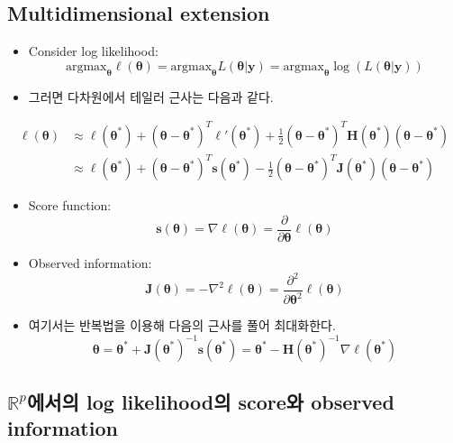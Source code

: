 \documentclass[
  letterpaper,
  DIV=11,
  numbers=noendperiod]{scrreprt}
\theoremstyle{definition}
\theoremstyle{definition}
\theoremstyle{remark}
\begin{document}
\subsection{Multidimensional
extension}\label{multidimensional-extension}

\begin{itemize}
\item
  Consider log likelihood: \[
  \text{argmax}_{\pmb{\theta}} \ell (\pmb{\theta}) = \text{argmax}_{\pmb{\theta}} L(\pmb{\theta}|\pmb{y})= \text{argmax}_{\pmb{\theta}} \log( L(\pmb{\theta}|\pmb{y}) )
  \]
\item
  그러면 다차원에서 테일러 근사는 다음과 같다.
\end{itemize}

\begin{align*}
\ell (\pmb{\theta}) &\approx \ell (\pmb{\theta}^{*}) + (\pmb{\theta} - \pmb{\theta}^{*})^T \ell ' (\pmb{\theta}^{*}) + \frac{1}{2} (\pmb{\theta} - \pmb{\theta}^{*})^T \pmb{H}(\pmb{\theta}^{*})(\pmb{\theta}-\pmb{\theta}^{*})\\
&\approx \ell (\pmb{\theta}^{*}) + (\pmb{\theta} - \pmb{\theta}^{*})^T \pmb{s} (\pmb{\theta}^{*}) - \frac{1}{2} (\pmb{\theta} - \pmb{\theta}^{*})^T \pmb{J}(\pmb{\theta}^{*})(\pmb{\theta}-\pmb{\theta}^{*})
\end{align*}

\begin{itemize}
\item
  Score function: \[
  \pmb{s} (\pmb{\theta}) = \nabla \ell (\pmb{\theta}) = \frac{\partial}{\partial \pmb{\theta}} \ell (\pmb{\theta})
  \]
\item
  Observed information: \[
  \pmb{J} (\pmb{\theta}) = -\nabla^2 \ell (\pmb{\theta}) = \frac{\partial^2}{\partial \pmb{\theta}^2}\ell (\pmb{\theta})
  \]
\item
  여기서는 반복법을 이용해 다음의 근사를 풀어 최대화한다. \[
  \pmb{\theta} = \pmb{\theta}^{*} + \pmb{J}(\pmb{\theta}^{*})^{-1}\pmb{s}(\pmb{\theta}^{*}) = \pmb{\theta}^{*} - \pmb{H}(\pmb{\theta}^{*})^{-1}\nabla \ell (\pmb{\theta}^{*})
  \]
\end{itemize}

\subsection{\texorpdfstring{\(\mathbb{R}^p\)에서의 log likelihood의
score와 observed
information}{\textbackslash mathbb\{R\}\^{}p에서의 log likelihood의 score와 observed information}}\label{mathbbrpuxc5d0uxc11cuxc758-log-likelihooduxc758-scoreuxc640-observed-information}
\end{document}
